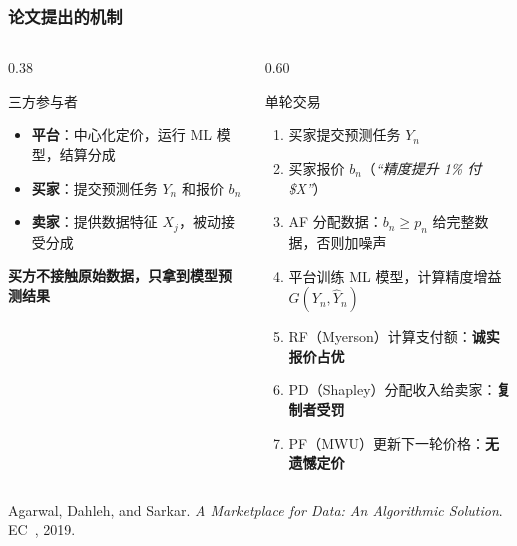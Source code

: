 \documentclass[10pt,aspectratio=169]{beamer}
\begin{document}
\begin{frame}
	\frametitle{论文提出的机制}

	\begin{columns}[T]
		\begin{column}{0.38\textwidth}
			\begin{block}{三方参与者}
				\begin{itemize}
					\item \textbf{平台}：中心化定价，运行 ML 模型，结算分成
					\item \textbf{买家}：提交预测任务 $Y_n$ 和报价 $b_n$
					\item \textbf{卖家}：提供数据特征 $X_j$，被动接受分成
				\end{itemize}
			\end{block}
			\vspace{0.3cm}
			\begin{center}
				\small\textbf{买方不接触原始数据，只拿到模型预测结果}
			\end{center}
		\end{column}
		\begin{column}{0.60\textwidth}
			\begin{block}{单轮交易}
				\begin{enumerate}
					\small
					\item 买家提交预测任务 $Y_n$
					\item 买家报价 $b_n$（\textit{``精度提升 1\% 付 \$X''}）
					\item AF 分配数据：$b_n \ge p_n$ 给完整数据，否则加噪声
					\item 平台训练 ML 模型，计算精度增益 $G(Y_n, \hat{Y}_n)$
					\item RF（Myerson）计算支付额：\textbf{诚实报价占优}
					\item PD（Shapley）分配收入给卖家：\textbf{复制者受罚}
					\item PF（MWU）更新下一轮价格：\textbf{无遗憾定价}
				\end{enumerate}
			\end{block}
		\end{column}
	\end{columns}
	\vspace{0.2cm}
	{\tiny Agarwal, Dahleh, and Sarkar. \textit{A Marketplace for Data: An Algorithmic Solution}. EC~, 2019.}

\end{frame}
\end{document}
